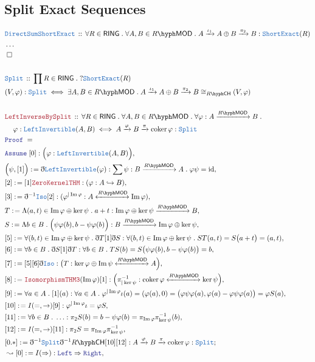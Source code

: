 \documentclass[12pt]{scrartcl}
\newcommand{\TYPE}[1]{\textcolor{NavyBlue}{\mathtt{#1}}}
\newcommand{\LOGIC}[1]{\textcolor{Blue}{\mathtt{#1}}}
\newcommand{\THM}[1]{\textcolor{Maroon}{\mathtt{#1}}}
\renewcommand{\.}{\; . \;}
\newcommand{\de}{: \kern 0.1pc =}
\newcommand{\Theorem}[2]{& \THM{#1} \, :: \, #2 \\ & \Proof = \\ }
\newcommand{\DeclareType}[2]{& \TYPE{#1} \, :: \, #2 \\}
\newcommand{\DefineType}[3]{& #1 : \TYPE{#2} \iff #3 \\}
\newcommand{\NewLine}{\\ & \kern 1pc}
\newcommand{\Page}[1]{ \begin{align*} #1 \end{align*}   }
\newcommand{ \bd }{ \ByDef }
\newcommand{\NoProof}{ & \ldots \\ \EndProof}
\DeclareMathOperator*{\id}{id}
\DeclareMathOperator*{\im}{Im}
\newcommand{\ToInj}{\hookrightarrow}
\newcommand{\Say}[3]{& #1 \de #2 : #3, \\}
\newcommand{\Conclude}[3]{& #1 \de #2 : #3; \\}
\newcommand{\Derive}[3]{& \leadsto #1 \de #2 : #3, \\}
\newcommand{\Assume}[2]{& \LOGIC{Assume} \; #1 : #2, \\}
\newcommand{\QED}{\; \square}
\newcommand{\EndProof}{& \QED \\}
\newcommand{\ByDef}{\eth}
\newcommand{\Proof}{\LOGIC{Proof} \; }
\newcommand{\Arrow}[1]{\xrightarrow{#1}}
\newcommand{\ToIso}[1]{\xleftrightarrow{#1}}
\DeclareMathOperator{\coker}{coker}
\newcommand{\LMOD}[1]{#1\hyph\mathsf{MOD}}
\newcommand{\RING}{\mathsf{RING}}
\newcommand{\ShortExact}{\TYPE{ShortExact}}
\newcommand{\CH}[1]{#1\hyph\mathsf{CH}}
\begin{document}
\subsection{Split Exact Sequences}
\Page{
	\DeclareType{DirectSumShortExact}
	{
		\forall R \in \RING \. \forall A,B \in \LMOD{R} \. 
		A \Arrow{\iota_1} A \oplus B \Arrow{\pi_2} B : \ShortExact(R)
	}
	\NoProof
	\\
	\DeclareType{Split}{\prod R \in \RING \. ?\ShortExact(R)}
	\DefineType{(V,\varphi)}{Split}{\exists A,B \in \LMOD{R} \.  A \Arrow{\iota_1}A \oplus B \Arrow{\pi_2} B \cong_{\CH{R}} (V,\varphi)}
	\\
	\Theorem{LeftInverseBySplit}
	{
		\forall R \in \RING \. \forall A,B \in \LMOD{R} \. \forall \varphi : A \Arrow{\LMOD{R}} B \.  \NewLine
		\varphi : \TYPE{LeftInvertible}(A,B) \iff  A \Arrow{\varphi} B \Arrow{\pi} \coker \varphi : \TYPE{Split} 
	}
	\Assume{[0]}{\Big(\varphi :\TYPE{LeftInvertible}(A,B)\Big)}
	\Say{\Big(\psi,[1]\Big)}{ \bd \TYPE{LeftInvertible}(\varphi)}{ \sum \psi : B \Arrow{\LMOD{R}} A \. \varphi \psi = \id }
	\Say{[2]}{[1]\THM{ZeroKernelTHM}}{ (\varphi  : A \ToInj B ) }
	\Say{[3]}{ \bd^{-1} \TYPE{Iso}[2] }{ (\varphi^{|\im \varphi} : A \ToIso{\LMOD{R}} \im \varphi)}
	\Say{T}{\Lambda (a,t) \in \im \varphi \oplus \ker \psi \. a  + t}{ \im \varphi \oplus \ker \psi \Arrow{\LMOD{R}} B}
	\Say{S}{\Lambda b \in B \. \Big(\psi\varphi(b), b - \psi\varphi(b)\Big)}{ B \Arrow{\LMOD{R}} \im \varphi \oplus \ker \psi}
	\Say{[5]}{\forall (b,t) \in \im \varphi \oplus \ker \psi \. \bd T [1]\bd S}{\forall (b,t) \in \im \varphi \oplus \ker \psi \.  ST(a,t)= S\big(a + t\big) = (a,t)}
	\Say{[6]}{\forall b \in B \.\bd S [1]\bd T}{\forall b \in  B \.  TS(b)= S\big(\psi\varphi(b) , b - \psi\varphi(b)\big) = b}
	\Say{[7]}{[5][6]\bd \TYPE{Iso}}{\big(T : \ker \varphi \oplus \im \psi \ToIso{\LMOD{R}} A\Big)}
	\Say{[8]}{\THM{IsomorphismTHM3}(\im \varphi)[1]}{\Big(\pi_{|\ker \psi}^{-1} : \coker \varphi \ToIso{\LMOD{R}} \ker \psi  \Big)}
	\Say{[9]}{\forall a \in A \. [1](a)}{ \forall a \in A \. \varphi^{|\im \varphi} \iota(a) = (\varphi(a),0) = \big(\varphi \psi\varphi(a),\varphi(a) - \varphi \psi \varphi(a) \big) = \varphi S(a)}
	\Say{[10]}{I(=,\to)[9]}{\varphi^{|\im \varphi} \iota  = \varphi S}
	\Say{[11]}{ \forall b \in B \. \ldots   }{ \pi_2 S(b) = b - \psi \varphi (b) = \pi_{\im \varphi} \pi^{-1}_{\ker \psi}(b)  }
	\Say{[12]}{I(=,\to)[11]}{\pi_2 S = \pi_{\im \varphi} \pi^{-1}_{\ker \psi} }
	\Conclude{[0.*]}{\bd^{-1}\TYPE{Split}\bd^{-1}\CH{R}[10][12]}{A \Arrow{\varphi} B \Arrow{\pi} \coker \varphi : \TYPE{Split}}
	\Derive{[0]}{I(\Rightarrow)}{\LOGIC{Left} \Rightarrow \LOGIC{Right}}
}
\end{document}
